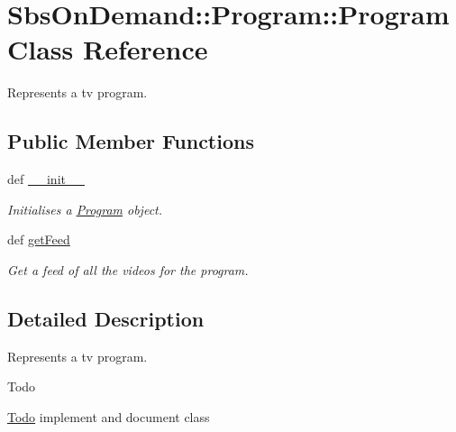 \hypertarget{class_sbs_on_demand_1_1_program_1_1_program}{
\section{\-Sbs\-On\-Demand\-:\-:\-Program\-:\-:\-Program \-Class \-Reference}
\label{class_sbs_on_demand_1_1_program_1_1_program}
}


\-Represents a tv program.  


\subsection*{\-Public \-Member \-Functions}
\begin{DoxyCompactItemize}
\item 
def \hyperlink{class_sbs_on_demand_1_1_program_1_1_program_ab089dcd7d5664a099d9f0121b9fbf5e9}{\-\_\-\-\_\-init\-\_\-\-\_\-}
\begin{DoxyCompactList}\small\item\em \-Initialises a \hyperlink{class_sbs_on_demand_1_1_program_1_1_program}{\-Program} object. \end{DoxyCompactList}\item 
def \hyperlink{class_sbs_on_demand_1_1_program_1_1_program_a5cbc233ce016ca395d2cd99cc5ce0364}{get\-Feed}
\begin{DoxyCompactList}\small\item\em \-Get a feed of all the videos for the program. \end{DoxyCompactList}\end{DoxyCompactItemize}


\subsection{\-Detailed \-Description}
\-Represents a tv program. 

\begin{DoxyRefDesc}{\-Todo}
\item[\hyperlink{todo__todo000003}{\-Todo}]implement and document class \end{DoxyRefDesc}


